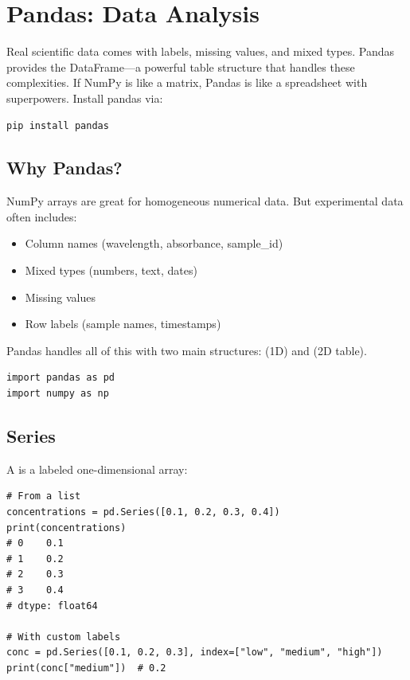 
\chapter{Pandas: Data Analysis}
\label{chap:pandas}

Real scientific data comes with labels, missing values, and mixed types. Pandas provides the DataFrame---a powerful table structure that handles these complexities. If NumPy is like a matrix, Pandas is like a spreadsheet with superpowers. Install pandas via:

\begin{lstlisting}
pip install pandas
\end{lstlisting}


\section{Why Pandas?}
\label{sec:why-pandas}

NumPy arrays are great for homogeneous numerical data. But experimental data often includes:

\begin{itemize}
    \item Column names (wavelength, absorbance, sample\_id)
    \item Mixed types (numbers, text, dates)
    \item Missing values
    \item Row labels (sample names, timestamps)
\end{itemize}

Pandas handles all of this with two main structures:  (1D) and  (2D table).

\begin{lstlisting}
import pandas as pd
import numpy as np
\end{lstlisting}

\section{Series}
\label{sec:series}

A  is a labeled one-dimensional array:

\begin{lstlisting}
# From a list
concentrations = pd.Series([0.1, 0.2, 0.3, 0.4])
print(concentrations)
# 0    0.1
# 1    0.2
# 2    0.3
# 3    0.4
# dtype: float64

# With custom labels
conc = pd.Series([0.1, 0.2, 0.3], index=["low", "medium", "high"])
print(conc["medium"])  # 0.2
\end{lstlisting}

